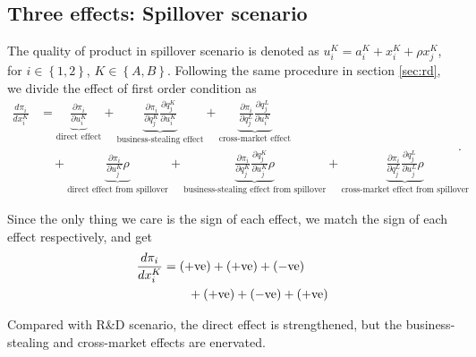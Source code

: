 \documentclass[12pt]{article}
\begin{document}
\subsection{Three effects: Spillover scenario}
\label{ssec:spillover_3_effects}

The quality of product in spillover scenario is denoted as $u_i^K = a_i^K + x_i^K + \rho x_j^K$, for $i \in \left\{ 1, 2 \right\}$, $K \in \left\{ A, B \right\}$.
Following the same procedure in section \ref{sec:rd}, we divide the effect of first order condition as 
\begin{equation}
    \begin{aligned}
        \frac{d \pi_i}{d x_i^K} & = \underset{\text{direct effect}}{\underbrace{\frac{\partial \pi_i}{\partial u_i^K}}} + \underset{\text{business-stealing effect}}{\underbrace{\frac{\partial \pi_i}{\partial q_j^K}  \frac{\partial q_j^K}{\partial u_i^K}}} + \underset{\text{cross-market effect}}{\underbrace{\frac{\partial \pi_i}{\partial q_j^L}  \frac{\partial q_j^L}{\partial u_i^K}}}\\
        & \quad + \underset{\text{direct effect from spillover}}{\underbrace{\frac{\partial \pi_i}{\partial u_j^K} \rho}} + \underset{\text{business-stealing effect from spillover}}{\underbrace{\frac{\partial \pi_i}{\partial q_j^K}  \frac{\partial q_j^K}{\partial u_j^K} \rho}} + \underset{\text{cross-market effect from spillover}}{\underbrace{\frac{\partial \pi_i}{\partial q_j^L}  \frac{\partial q_j^L}{\partial u_j^L} \rho}}
    \end{aligned}.
    \label{eq:spillover_3_effects}
\end{equation} 

Since the only thing we care is the sign of each effect, we match the sign of each effect respectively, and get 
\begin{equation}
    \begin{aligned}
        \frac{d \pi_i}{d x_i^K} & = (+ \text{ve}) + (+ \text{ve}) + (- \text{ve})\\
        & \text{\qquad} + (+ \text{ve}) + (- \text{ve}) + (+ \text{ve})
    \end{aligned}
    \label{eq:spillover_3_effects_sign}
\end{equation}
  
Compared with R\&D scenario, the direct effect is strengthened, but the business-stealing and cross-market effects are enervated.
\end{document}
